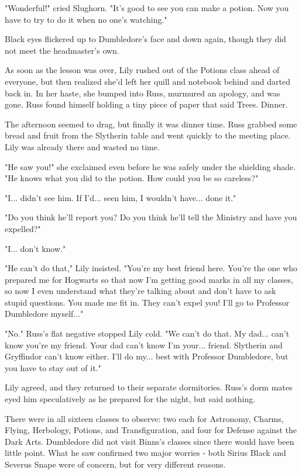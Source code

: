 \documentclass[a4paper,11pt]{article}
\begin{document}
"Wonderful!" cried Slughorn. "It's good to see you can make a potion. Now you have to try to do it when no one's watching."

Black eyes flickered up to Dumbledore's face and down again, though they did not meet the headmaster's own.

As soon as the lesson was over, Lily rushed out of the Potions class ahead of everyone, but then realized she'd left her quill and notebook behind and darted back in. In her haste, she bumped into Russ, murmured an apology, and was gone. Russ found himself holding a tiny piece of paper that said Trees. Dinner.

The afternoon seemed to drag, but finally it was dinner time. Russ grabbed some bread and fruit from the Slytherin table and went quickly to the meeting place. Lily was already there and wasted no time.

"He saw you!" she exclaimed even before he was safely under the shielding shade. "He knows what you did to the potion. How could you be so careless?"

"I... didn't see him. If I'd... seen him, I wouldn't have... done it."

"Do you think he'll report you? Do you think he'll tell the Ministry and have you expelled?"

"I... don't know."

"He can't do that," Lily insisted. "You're my best friend here. You're the one who prepared me for Hogwarts so that now I'm getting good marks in all my classes, so now I even understand what they're talking about and don't have to ask stupid questions. You made me fit in. They can't expel you! I'll go to Professor Dumbledore myself..."

"No." Russ's flat negative stopped Lily cold. "We can't do that. My dad... can't know you're my friend. Your dad can't know I'm your... friend. Slytherin and Gryffindor can't know either. I'll do my... best with Professor Dumbledore, but you have to stay out of it."

Lily agreed, and they returned to their separate dormitories. Russ's dorm mates eyed him speculatively as he prepared for the night, but said nothing.

There were in all sixteen classes to observe: two each for Astronomy, Charms, Flying, Herbology, Potions, and Transfiguration, and four for Defense against the Dark Arts. Dumbledore did not visit Binns's classes since there would have been little point. What he saw confirmed two major worries - both Sirius Black and Severus Snape were of concern, but for very different reasons.
\end{document}
